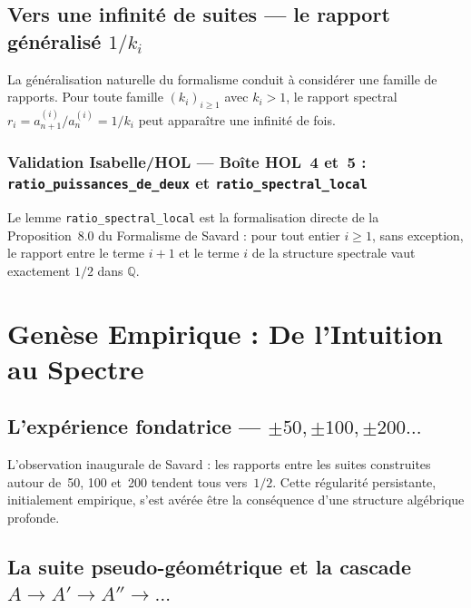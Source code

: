 \documentclass[]{pasj02}
\begin{document}
\subsection{Vers une infinité de suites --- le rapport généralisé $1/k_i$}
\label{ssec:generalisation}

La généralisation naturelle du formalisme conduit à considérer une famille
de rapports.  Pour toute famille $(k_i)_{i\geq1}$ avec $k_i > 1$, le
rapport spectral $r_i = a_{n+1}^{(i)}/a_n^{(i)} = 1/k_i$ peut apparaître
une infinité de fois.

\subsubsection*{Validation Isabelle/HOL --- Boîte HOL~4 et~5 :
\texttt{ratio\_puissances\_de\_deux} et \texttt{ratio\_spectral\_local}}

Le lemme \texttt{ratio\_spectral\_local} est la formalisation directe de la
Proposition~8.0 du Formalisme de Savard : pour tout entier $i \geq 1$, sans
exception, le rapport entre le terme $i+1$ et le terme $i$ de la structure
spectrale vaut exactement $1/2$ dans $\mathbb{Q}$.

\section{Genèse Empirique : De l'Intuition au Spectre}
\label{sec:genese}

\subsection{L'expérience fondatrice --- $\pm 50, \pm 100, \pm 200\ldots$}
\label{ssec:experience}

L'observation inaugurale de Savard : les rapports entre les suites
construites autour de~50, 100 et~200 tendent tous vers~$1/2$.  Cette
régularité persistante, initialement empirique, s'est avérée être la
conséquence d'une structure algébrique profonde.

\subsection{La suite pseudo-géométrique et la cascade $A \to A' \to A''
\to \ldots$}
\label{ssec:cascade}
\end{document}

